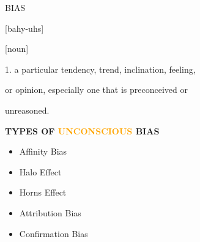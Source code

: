 \documentclass{beamer}
\begin{document}
\begin{frame}
    \begin{center}
    \begin{minipage}{.5\textwidth}
        \LARGE{BIAS}
    \end{minipage}
    \begin{minipage}{.3\textwidth}
        \normalsize{[bahy-uhs]}
    \end{minipage}
    \vspace{.5cm}

    \hspace{-8cm} \normalsize{[noun]}\\
    \end{center}
    \hspace{.8cm} \normalsize{1. a particular tendency, trend, inclination, feeling,}

    \hspace{1cm} \normalsize{or opinion, especially one that is preconceived or}

    \hspace{1cm} \normalsize{unreasoned.}
\end{frame}

\begin{frame}
    \begin{center}
        \textbf{\Large{TYPES OF \textcolor{orange}{UNCONSCIOUS} BIAS}} \\
        \hspace{1cm}

        \begin{minipage}{0.50\textwidth}
        \begin{itemize}
            \item Affinity Bias
            \item Halo Effect
            \item Horns Effect
            \item Attribution Bias
            \item Confirmation Bias
        \end{itemize}
        \end{minipage}
    \end{center}
\end{frame}
\end{document}
